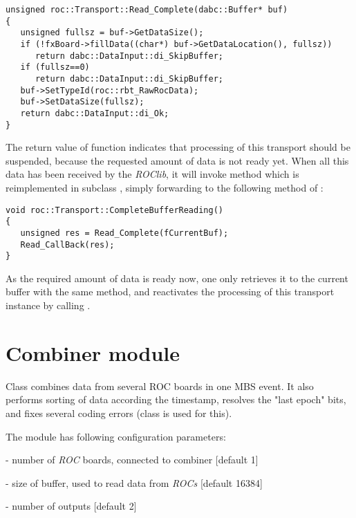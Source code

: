 \begin{small}
\begin{verbatim}
unsigned roc::Transport::Read_Complete(dabc::Buffer* buf)
{
   unsigned fullsz = buf->GetDataSize();
   if (!fxBoard->fillData((char*) buf->GetDataLocation(), fullsz)) 
      return dabc::DataInput::di_SkipBuffer;
   if (fullsz==0) 
      return dabc::DataInput::di_SkipBuffer;
   buf->SetTypeId(roc::rbt_RawRocData);
   buf->SetDataSize(fullsz);
   return dabc::DataInput::di_Ok;
}
\end{verbatim}
\end{small}

The return value 
of function  indicates 
that processing of this transport should be suspended, 
because the requested amount of data is not ready yet.
When all this data has been received by the {\em ROClib},
it will invoke method  
which is reimplemented in subclass ,
simply forwarding to
the following method of : 

\begin{small}
\begin{verbatim}
void roc::Transport::CompleteBufferReading()
{
   unsigned res = Read_Complete(fCurrentBuf);
   Read_CallBack(res);
}
\end{verbatim}
\end{small}

As the required amount of data is ready now,
one only retrieves it to the current buffer with the same 
 method, and 
reactivates the processing of this transport instance
by calling .   


\section{Combiner module}

Class  combines data from several ROC boards in one MBS event. It also performs sorting of data according the timestamp, resolves the "last epoch" bits, and fixes several coding errors (class  is
used for this).

The module has following configuration parameters:
\bbul
\item {}     - number of {\em ROC} boards, connected to combiner [default 1]  
\item {}  - size of buffer, used to read data from {\em ROCs} [default 16384]
\item {}  - number of outputs [default 2]
\ebul

